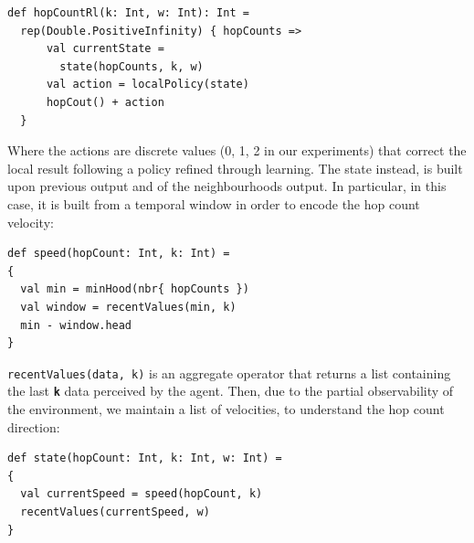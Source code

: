 \documentclass[conference]{IEEEtran}
\begin{document}
 \begin{verbatim}
def hopCountRl(k: Int, w: Int): Int = 
  rep(Double.PositiveInfinity) { hopCounts => 
      val currentState = 
        state(hopCounts, k, w)
      val action = localPolicy(state)
      hopCout() + action
  }
\end{verbatim}

Where the actions are discrete values (0, 1, 2 in our experiments) that correct the local result following a policy refined through learning.
%
The state instead, is built upon previous output and of the neighbourhoods output.
 In particular, in this case, it is built from a temporal window in order to encode the hop count velocity:
\begin{verbatim}
def speed(hopCount: Int, k: Int) =
{
  val min = minHood(nbr{ hopCounts })
  val window = recentValues(min, k)
  min - window.head 
}
\end{verbatim}
\texttt{recentValues(data, k)} is an aggregate operator that returns a list containing the last \textbf{\texttt{k}} data perceived by the agent.
Then, due to the partial observability of the environment, we maintain a 
 list of velocities, to understand the hop count direction:

 \begin{verbatim}
def state(hopCount: Int, k: Int, w: Int) =
{
  val currentSpeed = speed(hopCount, k)
  recentValues(currentSpeed, w)
}
\end{verbatim}
\end{document}
